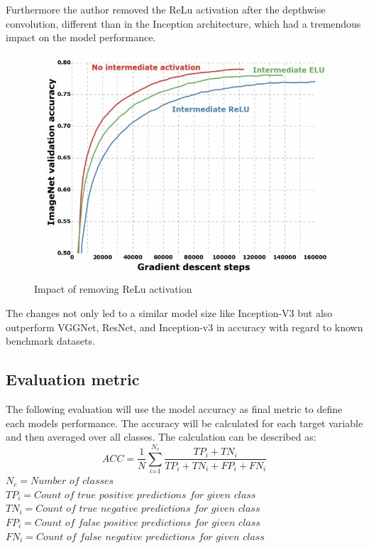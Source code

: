 Furthermore the author removed the ReLu activation after the depthwise convolution, different than in the Inception architecture, which had a tremendous impact on the model performance.
\begin{figure}
  \centering
  \includegraphics[width=\linewidth]{figures/xception_activation.png}
  \caption{Impact of removing ReLu activation}
  \label{xception_activation}
\end{figure}

The changes not only led to a similar model size like Inception-V3 but also outperform  VGGNet, ResNet, and Inception-v3 in accuracy with regard to known benchmark datasets\cite{chollet2017xception}.

\subsection{Evaluation metric}

The following evaluation will use the model accuracy as final metric to define  each models performance. The accuracy will be calculated for each target variable and then averaged over all classes. The calculation can be described as:
\begin{equation}
ACC=\frac{1}{N} \sum_\textit{i=1}^{N_\textit{c}} \displaystyle\frac{TP_{\textit{i}}+TN_{\textit{i}}}{TP_{\textit{i}}+TN_{\textit{i}}+FP_{\textit{i}}+FN_{\textit{i}}}
\end{equation}
\break
$N_\textit{c}=\textit{Number of classes}$\\
$TP_\textit{i} = \textit{Count of true positive predictions for given class}$\\
$TN_\textit{i} = \textit{Count of true negative predictions for given class}$\\
$FP_\textit{i} = \textit{Count of false positive predictions for given class}$\\
$FN_\textit{i} = \textit{Count of false negative predictions for given class}$





